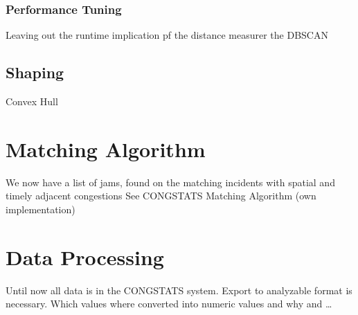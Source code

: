 \documentclass[a4paper,headsepline,footsepline,fontsize=11pt,BCOR=12mm,DIV=12]{report}
\begin{document}
\subsubsection{Performance Tuning}
Leaving out the runtime implication pf the distance measurer the DBSCAN 

\subsection{Shaping}
\label{methodology_shaping}

Convex Hull
\begin{figure}[h]
	\centering
\end{figure}


\section{Matching Algorithm}
\label{methodology_matching}
We now have a list of jams, found on the matching incidents with spatial and timely adjacent congestions
See CONGSTATS Matching Algorithm (own implementation)

\section{Data Processing}
\label{methodology_data_processing}
Until now all data is in the CONGSTATS system. Export to analyzable format is necessary.
Which values where converted into numeric values and why and …
\end{document}

